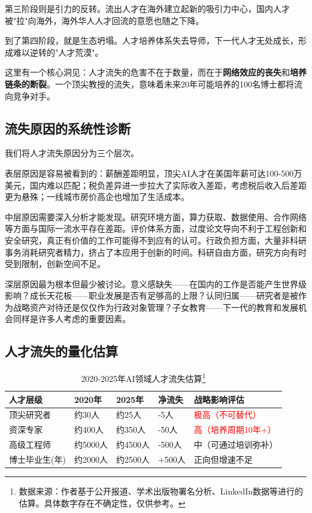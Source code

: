 第三阶段则是引力的反转。流出人才在海外建立起新的吸引力中心，国内人才被"拉"向海外，海外华人人才回流的意愿也随之下降。

到了第四阶段，就是生态坍塌。人才培养体系失去导师，下一代人才无处成长，形成难以逆转的"人才荒漠"。

这里有一个核心洞见：人才流失的危害不在于数量，而在于\textbf{网络效应的丧失}和\textbf{培养链条的断裂}。一个顶尖教授的流失，意味着未来20年可能培养的100名博士都将流向竞争对手。

\subsection{流失原因的系统性诊断}

我们将人才流失原因分为三个层次。

表层原因是容易被看到的：薪酬差距明显，顶尖AI人才在美国年薪可达100-500万美元，国内难以匹配；税负差异进一步拉大了实际收入差距，考虑税后收入后差距更为悬殊；一线城市房价高企也增加了生活成本。

中层原因需要深入分析才能发现。研究环境方面，算力获取、数据使用、合作网络等方面与国际一流水平存在差距。评价体系方面，过度论文导向不利于工程创新和安全研究，真正有价值的工作可能得不到应有的认可。行政负担方面，大量非科研事务消耗研究者精力，挤占了本应用于创新的时间。科研自由方面，研究方向有时受到限制，创新空间不足。

深层原因最为根本但最少被讨论。意义感缺失——在国内的工作是否能产生世界级影响？成长天花板——职业发展是否有足够高的上限？认同归属——研究者是被作为战略资产对待还是仅仅作为行政对象管理？子女教育——下一代的教育和发展机会同样是许多人考虑的重要因素。

\subsection{人才流失的量化估算}

\begin{table}[H]
\centering
\caption{2020-2025年AI领域人才流失估算\protect\footnote{数据来源：作者基于公开报道、学术出版物署名分析、LinkedIn数据等进行的估算。具体数字存在不确定性，仅供参考。}}
\small
\begin{tabular}{p{3cm}p{2cm}p{2cm}p{2cm}p{3cm}}
\toprule
\textbf{人才层级} & \textbf{2020年} & \textbf{2025年} & \textbf{净流失} & \textbf{战略影响评估} \\
\midrule
顶尖研究者 & 约30人 & 约25人 & -5人 & \textcolor{red}{极高（不可替代）} \\
资深专家 & 约400人 & 约350人 & -50人 & \textcolor{red}{高（培养周期10年+）} \\
高级工程师 & 约5000人 & 约4500人 & -500人 & 中（可通过培训弥补） \\
博士毕业生(年) & 约2000人 & 约2500人 & +500人 & 正向但增速不足 \\
\bottomrule
\end{tabular}
\end{table}

